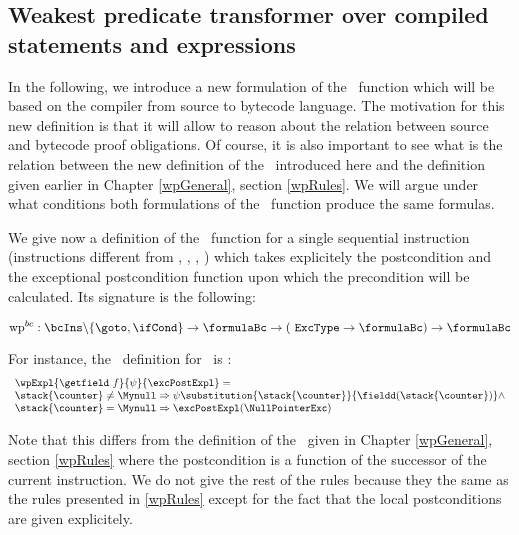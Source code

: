
\newtheorem{wpSeq}{Definition}[subsection]
\newtheorem{wpExpr}[wpSeq]{Definition}


\subsection{Weakest predicate transformer over compiled statements and expressions} \label{pog:wpBc}
In the following, we introduce a new formulation of the \wpName \ function 
which will be based on the compiler from source to bytecode  language.
The motivation for this new definition is that it will allow to reason about the
 relation between source and bytecode proof
obligations. 
Of course, it is also important to see what is the relation between the new definition
of the \wpName \ introduced here and the definition  given earlier in Chapter \ref{wpGeneral}, section \ref{wpRules}. 
We will argue under what conditions both formulations of the \wpName \ function produce the same formulas.



 



We give now a definition of the \wpName \ function for a single sequential instruction (instructions different from \goto, \ifCond, \jsr, \ret  ) which takes
explicitely the postcondition and the exceptional postcondition function 
upon which the precondition will be calculated. Its signature is the following:

$$ \mbox{\rm\textrm{wp}}^{bc} : \bcIns \backslash \{ \goto , \ifCond \}  \rightarrow \formulaBc \rightarrow ( \mbox{ \rm \texttt{ExcType}} \rightarrow \formulaBc ) \rightarrow \formulaBc$$

For instance, the \wpName \ definition for \getfield \ is :
$$ \begin{array}{l} \wpExpl{\getfield \ f }{ \psi  }{ \excPostExpl} = \\
		         \stack{\counter } \neq \Mynull \Rightarrow 
			                \psi   \substitution{ \stack{\counter} }{ \fieldd(\stack{\counter})} 		                    
			  \wedge \\
			  \stack{\counter }  = \Mynull  \Rightarrow   \excPostExpl( \NullPointerExc )
			  \end{array}$$ 

Note that this differs from the definition of the \wpName \  given in Chapter \ref{wpGeneral}, section \ref{wpRules} where the postcondition 
is a function of the successor of the current instruction. We do not give the rest of the rules because they the same as the rules presented in \ref{wpRules} except
for the fact that the local postconditions are given explicitely.

